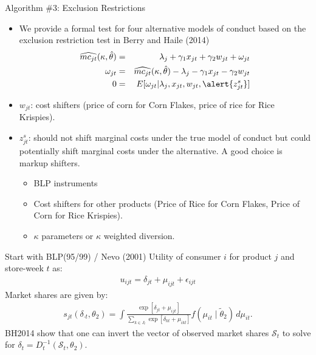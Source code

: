 \documentclass[xcolor=pdftex,dvipsnames,table,mathserif,aspectratio=169]{beamer}
\begin{document}
\begin{frame}{\normalsize Algorithm \#3: Exclusion Restrictions}
\small
\begin{itemize}
\item We provide a formal test for four alternative models of conduct based on the exclusion restriction test in Berry and Haile (2014) 
\begin{eqnarray*}
\widehat{mc_{jt}}(\kappa,\hat{\theta}) &=& \lambda_j +  \gamma_1 x_{jt} + \gamma_2 w_{jt} + \omega_{jt}\\
\omega_{jt} &=& \widehat{mc_{jt}}(\kappa,\hat{\theta}) - \lambda_j -  \gamma_1 x_{jt} - \gamma_2 w_{jt} \\
0 &=& E[ \omega_{jt} | \lambda_j, x_{jt}, w_{jt}, \alert{z_{jt}^s}]
\end{eqnarray*}
\item $w_{jt}$: cost shifters (price of corn for Corn Flakes, price of rice for Rice Krispies).
\item $z_{jt}^s$: should \alert{not} shift marginal costs under the true model of conduct but could potentially shift marginal costs under the alternative. A good choice is \alert{markup shifters}.
\begin{itemize}
\item BLP instruments
\item Cost shifters for other products (Price of Rice for Corn Flakes, Price of Corn for Rice Krispies).
\item $\kappa$ parameters or $\kappa$ weighted diversion.
\end{itemize}
\end{itemize}
\end{frame}

\begin{frame}{Start with BLP(95/99) / Nevo (2001)}
Utility of consumer $i$ for product $j$ and store-week $t$ as:
\begin{align*}
    u_{ijt} = \delta_{jt}+ \mu_{ijt}+  \epsilon_{ijt}
\end{align*}
Market shares are given by:
\begin{align*}
    s_{jt}(\delta_{\cdot t},\theta_2) = \int \frac{\exp[ \delta_{jt} + \mu_{ijt} ]}{\sum_{k \in J_t} \exp[ \delta_{kt} + \mu_{ikt} ]} f(\mu_{it} \mid \widetilde{\theta}_2) \, d\mu_{it}.
\end{align*}
BH2014 show that one can invert the vector of observed market shares $\mathcal{S}_t$ to solve for $\delta_{t}=D_{t}^{-1}(\mathcal{S}_t, \theta_2)$.\\
\end{frame}
\end{document}
